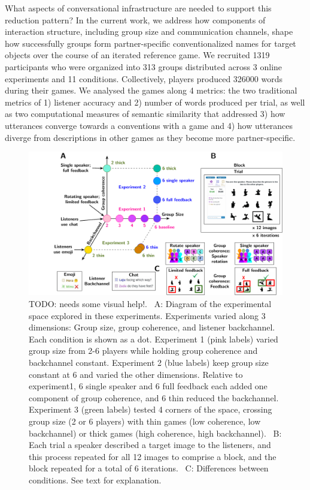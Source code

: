 \documentclass[
  english,
  a4paper,
]{article}
\begin{document}
What aspects of conversational infrastructure are needed to support this reduction pattern? In the current work, we address how components of interaction structure, including group size and communication channels, shape how successfully groups form partner-specific conventionalized names for target objects over the course of an iterated reference game. We recruited 1319 participants who were organized into 313 groups distributed across 3 online experiments and 11 conditions. Collectively, players produced 326000 words during their games. We analysed the games along 4 metrics: the two traditional metrics of 1) listener accuracy and 2) number of words produced per trial, as well as two computational measures of semantic similarity that addressed 3) how utterances converge towards a conventions with a game and 4) how utterances diverge from descriptions in other games as they become more partner-specific.

\begin{figure}[t!]

{\centering \includegraphics[width=1\linewidth]{expt-diagram} 

}

\caption{TODO: needs some visual help!. \ A: Diagram of the experimental space explored in these experiments. Experiments varied along 3 dimensions: Group size, group coherence, and listener backchannel. Each condition is shown as a dot. Experiment 1 (pink labels) varied group size from 2-6 players while holding group coherence and backchannel constant. Experiment 2 (blue labels) keep group size constant at 6 and varied the other dimensions. Relative to experiment1, 6 single speaker and 6 full feedback each added one component of group coherence, and 6 thin reduced the backchannel. Experiment 3 (green labels) tested 4 corners of the space, crossing group size (2 or 6 players) with thin games (low coherence, low backchannel) or thick games (high coherence, high backchannel). \  B: Each trial a speaker described a target image to the listeners, and this process repeated for all 12 images to comprise a block, and the block repeated for a total of 6 iterations. \ C: Differences between conditions. See text for explanation.}\label{fig:diagram}
\end{figure}
\end{document}
